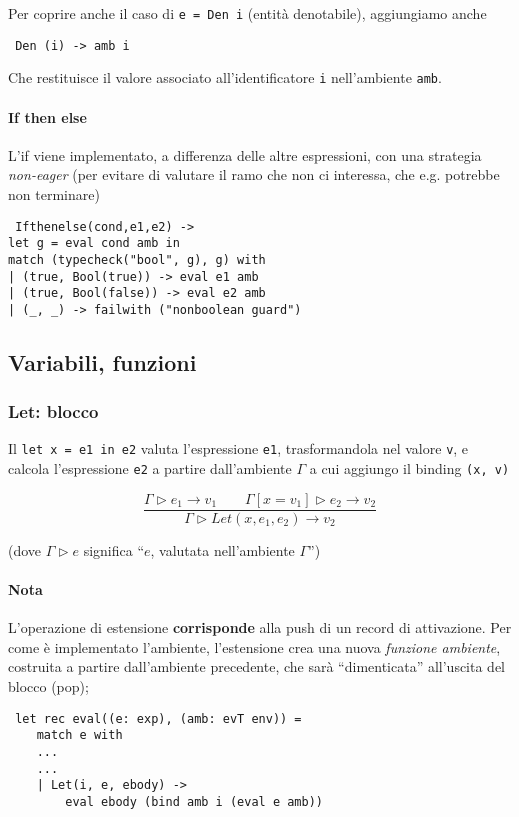 \documentclass[a4paper,10pt]{article}
\begin{document}
Per coprire anche il caso di \texttt{e = Den i} (entità denotabile), aggiungiamo anche

\begin{lstlisting}
 Den (i) -> amb i
\end{lstlisting}
Che restituisce il valore associato all'identificatore \texttt{i} nell'ambiente \texttt{amb}.

\newpage
\paragraph{If then else}
L'if viene implementato, a differenza delle altre espressioni, con una strategia \emph{non-eager} (per evitare di valutare il ramo che non ci interessa, che e.g. potrebbe non terminare)
\begin{lstlisting}
 Ifthenelse(cond,e1,e2) ->
let g = eval cond amb in
match (typecheck("bool", g), g) with
| (true, Bool(true)) -> eval e1 amb
| (true, Bool(false)) -> eval e2 amb
| (_, _) -> failwith ("nonboolean guard")
\end{lstlisting}

\subsection{Variabili, funzioni}
\subsubsection{Let: blocco}
Il \texttt{let x = e1 in e2} valuta l'espressione \texttt{e1}, trasformandola nel valore \texttt v, e calcola l'espressione \texttt{e2} a partire dall'ambiente $\Gamma$ a cui aggiungo il binding \texttt{(x, v)}

\[ \dfrac{\Gamma \triangleright e_1 \to v_1 \quad \quad \Gamma [x = v_1] \triangleright e_2 \to v_2}{\Gamma \triangleright Let (x, e_1, e_2) \to v_2} \]

(dove $\Gamma \triangleright e$ significa ``$e$, valutata nell'ambiente $\Gamma$'')

\paragraph{Nota} L'operazione di estensione \textbf{corrisponde} alla push di un record di attivazione. Per come è implementato l'ambiente, l'estensione crea una nuova \emph{funzione ambiente}, costruita a partire dall'ambiente precedente, che sarà ``dimenticata'' all'uscita del blocco (pop);

\begin{lstlisting}
 let rec eval((e: exp), (amb: evT env)) =
    match e with
    ...
    ...
    | Let(i, e, ebody) ->
        eval ebody (bind amb i (eval e amb))
\end{lstlisting}
\end{document}
